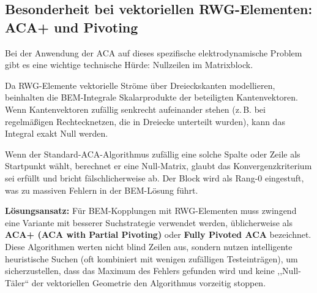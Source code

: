 \documentclass[11pt,a4paper]{article}
\begin{document}
\subsection{Besonderheit bei vektoriellen RWG-Elementen: ACA+ und Pivoting}
Bei der Anwendung der ACA auf dieses spezifische elektrodynamische Problem gibt es eine wichtige technische Hürde: Nullzeilen im Matrixblock.

Da RWG-Elemente vektorielle Ströme über Dreieckskanten modellieren, beinhalten die BEM-Integrale Skalarprodukte der beteiligten Kantenvektoren. Wenn Kantenvektoren zufällig senkrecht aufeinander stehen (z.\,B. bei regelmäßigen Rechtecknetzen, die in Dreiecke unterteilt wurden), kann das Integral exakt Null werden. 

Wenn der Standard-ACA-Algorithmus zufällig eine solche Spalte oder Zeile als Startpunkt wählt, berechnet er eine Null-Matrix, glaubt das Konvergenzkriterium sei erfüllt und bricht fälschlicherweise ab. Der Block wird als Rang-0 eingestuft, was zu massiven Fehlern in der BEM-Lösung führt.

\textbf{Lösungsansatz:} Für BEM-Kopplungen mit RWG-Elementen muss zwingend eine Variante mit besserer Suchstrategie verwendet werden, üblicherweise als \textbf{ACA+ (ACA with Partial Pivoting)} oder \textbf{Fully Pivoted ACA} bezeichnet. 
Diese Algorithmen werten nicht blind Zeilen aus, sondern nutzen intelligente heuristische Suchen (oft kombiniert mit wenigen zufälligen Testeinträgen), um sicherzustellen, dass das Maximum des Fehlers gefunden wird und keine ,,Null-Täler`` der vektoriellen Geometrie den Algorithmus vorzeitig stoppen.
\end{document}
